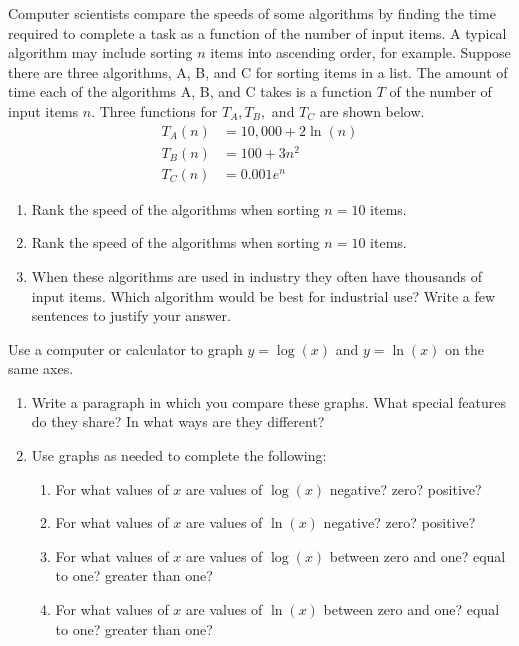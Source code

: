 \documentclass[10pt,]{book}
\theoremstyle{ptxdefinitionnotitle}
\theoremstyle{ptxdefinitiontitle}
\theoremstyle{ptxdefinitionnotitle}
\theoremstyle{ptxdefinitiontitle}
\theoremstyle{ptxdefinitionnotitle}
\theoremstyle{ptxdefinitiontitle}
\numberwithin{equation}{section}
\newcommand{\amp}{&}
\begin{document}
\begin{divisionexercise}{3}\hypertarget{exercise-93}{}
\hypertarget{p-358}{}%
Computer scientists compare the speeds of some algorithms by finding the time required to complete a task as a function of the number of input items. A typical algorithm may include sorting \(n\) items into ascending order, for example. Suppose there are three algorithms, A, B, and C for sorting items in a list. The amount of time each of the algorithms A, B, and C takes is a function \(T\) of the number of input items \(n\). Three functions for \(T_A, T_B,\) and \(T_C\) are shown below.%
\begin{align*}
T_A(n) \amp = 10,000 + 2\ln(n)\\
T_B(n) \amp = 100 + 3n^2\\
T_C(n) \amp = 0.001e^n
\end{align*}
\leavevmode%
\begin{enumerate}[label=(\alph*)]
\item\hypertarget{li-250}{}Rank the speed of the algorithms when sorting \(n = 10\) items.%
\item\hypertarget{li-251}{}Rank the speed of the algorithms when sorting \(n = 10\) items.%
\item\hypertarget{li-252}{}When these algorithms are used in industry they often have thousands of input items. Which algorithm would be best for industrial use?  Write a few sentences to justify your answer.%
\end{enumerate}
%
\end{divisionexercise}%
\begin{divisionexercise}{4}\hypertarget{exercise-94}{}
\hypertarget{p-359}{}%
Use a computer or calculator to graph \(y = \log(x)\) and \(y = \ln(x)\) on the same axes. \leavevmode%
\begin{enumerate}[label=(\alph*)]
\item\hypertarget{li-253}{}Write a paragraph in which you compare these graphs.  What special features do they share?  In what ways are they different?%
\item\hypertarget{li-254}{}\hypertarget{p-360}{}%
Use graphs as needed to complete the following: %
\begin{enumerate}[label=\roman*.]
\item\hypertarget{li-255}{}For what values of \(x\) are values of \(\log(x)\) negative? zero? positive?%
\item\hypertarget{li-256}{}For what values of \(x\) are values of \(\ln(x)\) negative? zero? positive?%
\item\hypertarget{li-257}{}For what values of \(x\) are values of \(\log(x)\) between zero and one? equal to one? greater than one?%
\item\hypertarget{li-258}{}For what values of \(x\) are values of \(\ln(x)\) between zero and one? equal to one? greater than one?%
\end{enumerate}
%
\end{enumerate}
%
\end{divisionexercise}%
\end{document}
